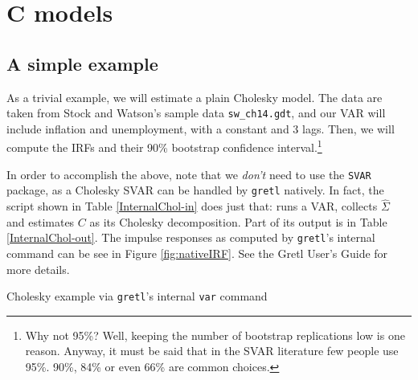 \documentclass[a4paper,10pt]{article}
\newcounter{script}[section]
\begin{document}

\section{C models}
\label{sec:Cmodel}
\subsection{A simple example}

As a trivial example, we will estimate a plain Cholesky model. The
data are taken from Stock and Watson's sample data
\texttt{sw\_ch14.gdt}, and our VAR will include inflation and
unemployment, with a constant and 3 lags. Then, we will compute the
IRFs and their 90\% bootstrap confidence interval.\footnote{Why not
  95\%? Well, keeping the number of bootstrap replications low is one
  reason. Anyway, it must be said that in the SVAR literature few
  people use 95\%. 90\%, 84\% or even 66\% are common choices.}
  
In order to accomplish the above, note that we \emph{don't} need to
use the \texttt{SVAR} package, as a Cholesky SVAR can be handled by
\texttt{gretl} natively. In fact, the script shown in Table
\ref{InternalChol-in} does just that: runs a VAR, collects
$\hat{\Sigma}$ and estimates $C$ as its Cholesky decomposition. 
Part of its output is in Table \ref{InternalChol-out}.  The impulse
responses as computed by \texttt{gretl}'s internal command can be see
in Figure \ref{fig:nativeIRF}. See the Gretl User's Guide for more
details.  
  
\begin{table}[htbp]
  \caption{Cholesky example via \texttt{gretl}'s internal 
  \texttt{var} command}
   \label{InternalChol-in}
\end{table}
\end{document}
